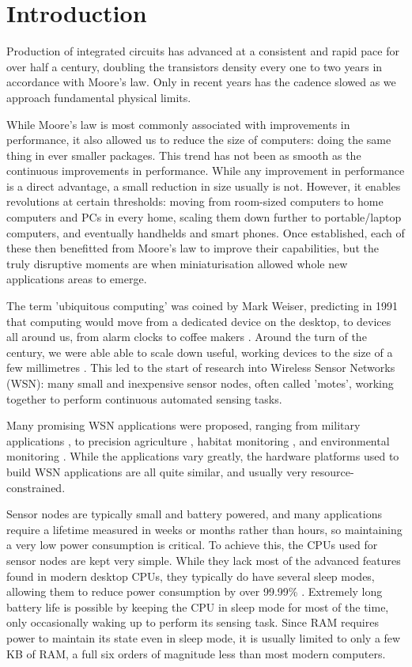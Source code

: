 \chapter{Introduction}
\label{sec-introduction}

Production of integrated circuits has advanced at a consistent and rapid pace for over half a century, doubling the transistors density every one to two years in accordance with Moore's law. Only in recent years has the cadence slowed as we approach fundamental physical limits.

While Moore's law is most commonly associated with improvements in performance, it also allowed us to reduce the size of computers: doing the same thing in ever smaller packages. This trend has not been as smooth as the continuous improvements in performance. While any improvement in performance is a direct advantage, a small reduction in size usually is not. However, it enables revolutions at certain thresholds: moving from room-sized computers to home computers and PCs in every home,  scaling them down further to portable/laptop computers, and eventually handhelds and smart phones. Once established, each of these then benefitted from Moore's law to improve their capabilities, but the truly disruptive moments are when miniaturisation allowed whole new applications areas to emerge.

The term 'ubiquitous computing' was coined by Mark Weiser, predicting in 1991 that computing would move from a dedicated device on the desktop, to devices all around us, from alarm clocks to coffee makers \cite{Weiser:1991wz}. Around the turn of the century, we were able able to scale down useful, working devices to the size of a few millimetres \cite{Warneke:2001ui}. This led to the start of research into Wireless Sensor Networks (WSN): many small and inexpensive sensor nodes, often called 'motes', working together to perform continuous automated sensing tasks.

Many promising WSN applications were proposed, ranging from military applications \cite{Arora:2004}, to precision agriculture \cite{Langendoen:2006un}, habitat monitoring \cite{Mainwaring:2002wb}, and environmental monitoring \cite{WernerAllen:2006ta, Chang:2010ek}. While the applications vary greatly, the hardware platforms used to build WSN applications are all quite similar, and usually very resource-constrained.

Sensor nodes are typically small and battery powered, and many applications require a lifetime measured in weeks or months rather than hours, so maintaining a very low power consumption is critical. To achieve this, the CPUs used for sensor nodes are kept very simple. While they lack most of the advanced features found in modern desktop CPUs, they typically do have several sleep modes, allowing them to reduce power consumption by over 99.99\% \cite{Atmel:ATmega128Datasheet}. Extremely long battery life is possible by keeping the CPU in sleep mode for most of the time, only occasionally waking up to perform its sensing task. Since RAM requires power to maintain its state even in sleep mode, it is usually limited to only a few KB of RAM, a full six orders of magnitude less than most modern computers.

